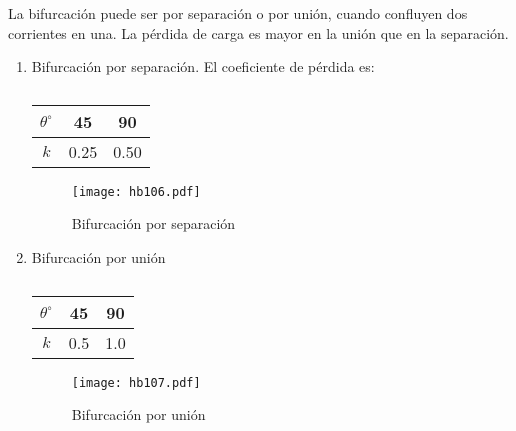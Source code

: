 La bifurcación puede ser por separación o por unión, cuando confluyen dos corrientes en una. La pérdida de carga es mayor en la unión que en la separación.

\begin{enumerate}
    \item Bifurcación por separación.
    El coeficiente de pérdida es:
    \begin{table}[h!]
        \centering
        \begin{tabular}{@{}ccc@{}}
        \toprule
        $\theta^{\circ}$ & 45   & 90   \\ \midrule
        $k$              & 0.25 & 0.50 \\ \bottomrule
        \end{tabular}
        \caption{}
        \label{tabhb19}
        \end{table}
        \begin{figure}[h!]
        \centering
          \texttt{[image: hb106.pdf]}
          \caption{Bifurcación por separación}
          \label{hb106}
        \end{figure}
    \item Bifurcación por unión
    \begin{table}[h!]
        \centering
        \begin{tabular}{@{}ccc@{}}
        \toprule
        $\theta^{\circ}$ & 45   & 90   \\ \midrule
        $k$              & 0.5 & 1.0 \\ \bottomrule
        \end{tabular}
        \caption{}
        \label{tabhb20}
        \end{table}
        \begin{figure}[h!]
        \centering
          \texttt{[image: hb107.pdf]}
          \caption{Bifurcación por unión}
          \label{hb107}
        \end{figure}
\end{enumerate}

